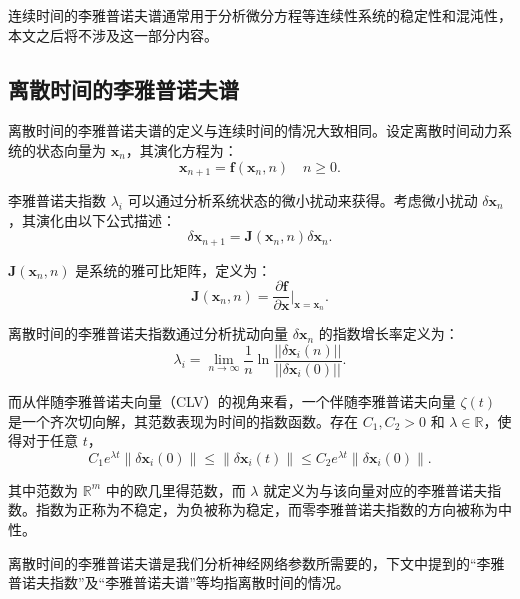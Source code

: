 连续时间的李雅普诺夫谱通常用于分析微分方程等连续性系统的稳定性和混沌性，本文之后将不涉及这一部分内容。

\subsection{离散时间的李雅普诺夫谱}

离散时间的李雅普诺夫谱的定义与连续时间的情况大致相同。设定离散时间动力系统的状态向量为 \(\mathbf{x}_n\)，其演化方程为：
\begin{equation}
      \mathbf{x}_{n+1} = \mathbf{f}(\mathbf{x}_n, n) \quad n \geq 0.
\end{equation}

李雅普诺夫指数 \(\lambda_i\) 可以通过分析系统状态的微小扰动来获得。考虑微小扰动 \(\delta \mathbf{x}_n\)，其演化由以下公式描述：
\begin{equation}
      \delta \mathbf{x}_{n+1} = \mathbf{J}(\mathbf{x}_n, n) \delta \mathbf{x}_n.
\end{equation}

\(\mathbf{J}(\mathbf{x}_n, n)\) 是系统的雅可比矩阵，定义为：
\begin{equation}
      \mathbf{J}(\mathbf{x}_n, n) = \frac{\partial \mathbf{f}}{\partial \mathbf{x}} \bigg|_{\mathbf{x} = \mathbf{x}_n}.
\end{equation}

离散时间的李雅普诺夫指数通过分析扰动向量 \(\delta \mathbf{x}_n\) 的指数增长率定义为：
\begin{equation}
      \lambda_i = \lim_{n \to \infty} \frac{1}{n} \ln \frac{||\delta \mathbf{x}_i(n)||}{||\delta \mathbf{x}_i(0)||}.
\end{equation}

而从伴随李雅普诺夫向量（CLV）的视角来看，一个伴随李雅普诺夫向量 $\zeta(t)$ 是一个齐次切向解，其范数表现为时间的指数函数。存在 $C_1, C_2 > 0$ 和 $\lambda \in \mathbb{R}$，使得对于任意 $t$，
\begin{equation}
      C_1 e^{\lambda t} \|\delta \mathbf{x}_i(0)\| \leq \|\delta \mathbf{x}_i(t)\| \leq C_2 e^{\lambda t} \|\delta \mathbf{x}_i(0)\|.
\end{equation}

其中范数为 $\mathbb{R}^m$ 中的欧几里得范数，而 $\lambda$ 就定义为与该向量对应的李雅普诺夫指数。指数为正称为不稳定，为负被称为稳定，而零李雅普诺夫指数的方向被称为中性。

离散时间的李雅普诺夫谱是我们分析神经网络参数所需要的，下文中提到的“李雅普诺夫指数”及“李雅普诺夫谱”等均指离散时间的情况。

